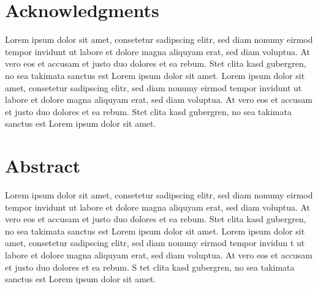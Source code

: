 \setcounter{page}{1}

\section*{Acknowledgments}
{
Lorem ipsum dolor sit amet, consetetur sadipscing elitr, sed diam nonumy eirmod tempor invidunt ut labore et dolore magna aliquyam erat, sed diam voluptua. 
At vero eos et accusam et justo duo dolores et ea rebum. Stet clita kasd gubergren, no sea takimata sanctus est Lorem ipsum dolor sit amet. 
Lorem ipsum dolor sit amet, consetetur sadipscing elitr, sed diam nonumy eirmod tempor invidunt ut labore et dolore magna aliquyam erat, sed diam voluptua. 
At vero eos et accusam et justo duo dolores et ea rebum. Stet clita kasd gubergren, no sea takimata sanctus est Lorem ipsum dolor sit amet.
}
\begin{comment}
\section*{Acknowledgments}


\end{comment}
\clearpage

    
\section*{Abstract}

Lorem ipsum dolor sit amet, consetetur sadipscing elitr, sed diam nonumy eirmod tempor invidunt ut labore et dolore magna aliquyam erat,
 sed diam voluptua. At vero eos et accusam et justo duo dolores et ea rebum. Stet clita kasd gubergren, no sea takimata sanctus est
  Lorem ipsum dolor sit amet. Lorem ipsum dolor sit amet, consetetur sadipscing elitr, sed diam nonumy eirmod tempor invidun
  t ut labore et dolore magna aliquyam erat, sed diam voluptua. At vero eos et accusam et justo duo dolores et ea rebum. S
  tet clita kasd gubergren, no sea takimata sanctus est Lorem ipsum dolor sit amet.
\clearpage
